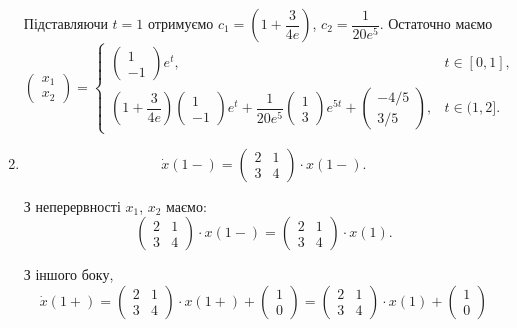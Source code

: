 \begin{solution}
\begin{enumerate}
		Підставляючи $t = 1$ отримуємо $c_1 = \left(1 + \dfrac{3}{4e}\right)$, $c_2 = \dfrac{1}{20e^5}$. Остаточно маємо 
		\[ \begin{pmatrix} x_1 \\ x_2 \end{pmatrix} = \begin{cases} \begin{pmatrix} 1 \\ -1 \end{pmatrix} e^t, & t \in [0, 1], \\ \left(1 + \dfrac{3}{4e}\right) \begin{pmatrix} 1 \\ -1 \end{pmatrix} e^t + \dfrac{1}{20e^5} \begin{pmatrix} 1 \\ 3 \end{pmatrix} e^{5t} + \begin{pmatrix} -4/5 \\ 3/5 \end{pmatrix}, & t \in (1, 2]. \end{cases}\]
		
		\item 
		\[ \dot x (1-) = \begin{pmatrix} 2 & 1 \\ 3 & 4	\end{pmatrix} \cdot x(1-). \]
		
		З неперервності $x_1$, $x_2$ маємо:
		\[ \begin{pmatrix} 2 & 1 \\ 3 & 4 \end{pmatrix} \cdot x(1-) = \begin{pmatrix} 2 & 1 \\ 3 & 4 \end{pmatrix} \cdot x(1). \]
		
		З іншого боку,
		\[ \dot x (1+) = \begin{pmatrix} 2 & 1 \\ 3 & 4 \end{pmatrix} \cdot x(1+) + \begin{pmatrix} 1 \\ 0 \end{pmatrix} = \begin{pmatrix} 2 & 1 \\ 3 & 4 \end{pmatrix} \cdot x(1) + \begin{pmatrix} 1 \\ 0 \end{pmatrix} \]
		

\end{enumerate}
\end{solution}
